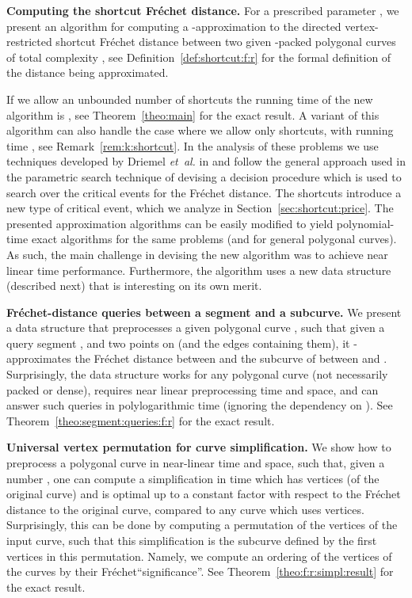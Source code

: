 \documentclass[12pt]{article}
\newcommand{\secref}[1]{Section~\ref{sec:#1}}
\newcommand{\thmref}[1]{Theorem~\ref{theo:#1}}
\newcommand{\remrefpage}[1]{Remark~\ref{rem:#1}}
\newcommand{\defref}[1]{Definition~\ref{def:#1}}
\newcommand{\etal}{\textit{et~al.}\xspace}
\newcommand{\Frechet}{Fr\'{e}c{h}e{}t\xspace}\providecommand{\Arr}{\mathop{\mathrm{\EuScript{A}}}}
\numberwithin{figure}{section}
\numberwithin{equation}{section}
\newcommand{\vrestricted}{vertex-restricted}
\newcommand{\asymmetric}{directed}
\begin{document}
\begin{compactenum}[(A)]
    \item \textbf{Computing the shortcut \Frechet distance.} For a prescribed parameter , we present an algorithm for
    computing a -approximation to the \asymmetric{}
    \vrestricted{} shortcut \Frechet distance between two given
    -packed polygonal curves of total complexity , see
    \defref{shortcut:f:r} for the formal definition of the distance
    being approximated.
    
    If we allow an unbounded number of shortcuts the running time of
    the new algorithm is , see \thmref{main} for the
    exact result. A variant of this algorithm can also handle the case
    where we allow only  shortcuts, with running time
    , see \remrefpage{k:shortcut}.  In the analysis of
    these problems we use techniques developed by Driemel \etal{} in
    \cite{dhw-afdrc-12} and follow the general approach used in the
    parametric search technique of devising a decision procedure which
    is used to search over the critical events for the \Frechet
    distance.  The shortcuts introduce a new type of critical event,
    which we analyze in \secref{shortcut:price}.  The presented
    approximation algorithms can be easily modified to yield
    polynomial-time exact algorithms for the same problems (and for
    general polygonal curves). As such, the main challenge in devising
    the new algorithm was to achieve near linear time performance.
    Furthermore, the algorithm uses a new data structure (described
    next) that is interesting on its own merit.
    
    \item \textbf{\Frechet-distance queries between a segment and a
       subcurve.} We present a data structure that preprocesses a given polygonal
    curve , such that given a query segment , and two
    points  on  (and the edges containing them), it
    -approximates the \Frechet distance between  and
    the subcurve of  between  and . Surprisingly,
    the data structure works for any polygonal curve (not necessarily
    packed or dense), requires near linear preprocessing time and
    space, and can answer such queries in polylogarithmic time
    (ignoring the dependency on ). See
    \thmref{segment:queries:f:r} for the exact result.
    
    \item \textbf{Universal vertex permutation for curve
       simplification.} We show how to preprocess a polygonal curve in near-linear time
    and space, such that, given a number , one can compute
    a simplification in  time which has 
    vertices (of the original curve) and is optimal up to a constant
    factor with respect to the \Frechet distance to the original
    curve, compared to any curve which uses 
    vertices. Surprisingly, this can be done by computing a
    permutation of the vertices of the input curve, such that this
    simplification is the subcurve defined by the first  vertices
    in this permutation. Namely, we compute an ordering of the
    vertices of the curves by their \Frechet ``significance''.  See
    \thmref{f:r:simpl:result} for the exact result.
    

\end{compactenum}
\end{document}
